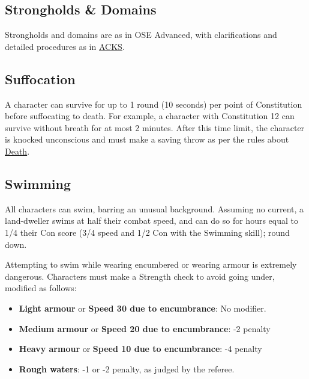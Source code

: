 \documentclass{book}
\providecommand{\tightlist}{%
\setlength{\itemsep}{0pt}\setlength{\parskip}{0pt}}
\begin{document}
\subsection*{Strongholds \& Domains}\label{strongholds-domains}

Strongholds and domains are as in OSE Advanced, with clarifications and
detailed procedures as in
\href{https://alexmooney.github.io/ACKS_SRD/Chapter07.html\#strongholds-and-domains}{ACKS}.

\subsection*{Suffocation}\label{suffocation}

A character can survive for up to 1 round (10 seconds) per point of
Constitution before suffocating to death. For example, a character with
Constitution 12 can survive without breath for at most 2 minutes. After
this time limit, the character is knocked unconscious and must make a
saving throw as per the rules about \hyperref[death]{Death}.

\subsection*{Swimming}\label{swimming}

All characters can swim, barring an unusual background. Assuming no
current, a land-dweller swims at half their combat speed, and can do so
for hours equal to 1/4 their Con score (3/4 speed and 1/2 Con with the
Swimming skill); round down.

Attempting to swim while wearing encumbered or wearing armour is
extremely dangerous. Characters must make a Strength check to avoid
going under, modified as follows:

\begin{itemize}
\tightlist
\item
  \textbf{Light armour} or \textbf{Speed 30 due to encumbrance}: No
  modifier.
\item
  \textbf{Medium armour} or \textbf{Speed 20 due to encumbrance}: -2
  penalty
\item
  \textbf{Heavy armour} or \textbf{Speed 10 due to encumbrance}: -4
  penalty
\item
  \textbf{Rough waters}: -1 or -2 penalty, as judged by the referee.
\end{itemize}
\end{document}
